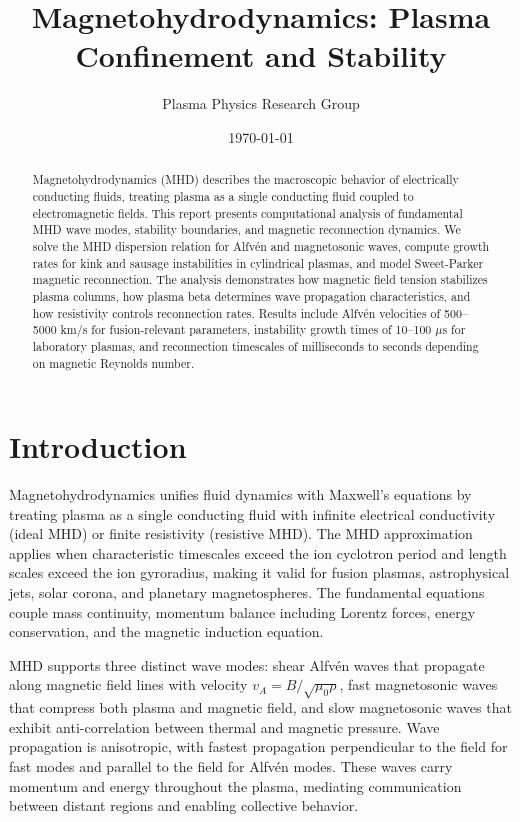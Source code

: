 \documentclass[11pt,a4paper]{article}
\title{Magnetohydrodynamics: Plasma Confinement and Stability}
\author{Plasma Physics Research Group}
\date{\today}
\begin{document}
\maketitle

\begin{abstract}
Magnetohydrodynamics (MHD) describes the macroscopic behavior of electrically conducting fluids, treating plasma as a single conducting fluid coupled to electromagnetic fields. This report presents computational analysis of fundamental MHD wave modes, stability boundaries, and magnetic reconnection dynamics. We solve the MHD dispersion relation for Alfvén and magnetosonic waves, compute growth rates for kink and sausage instabilities in cylindrical plasmas, and model Sweet-Parker magnetic reconnection. The analysis demonstrates how magnetic field tension stabilizes plasma columns, how plasma beta determines wave propagation characteristics, and how resistivity controls reconnection rates. Results include Alfvén velocities of 500–5000 km/s for fusion-relevant parameters, instability growth times of 10–100 $\mu$s for laboratory plasmas, and reconnection timescales of milliseconds to seconds depending on magnetic Reynolds number.
\end{abstract}

\section{Introduction}

Magnetohydrodynamics unifies fluid dynamics with Maxwell's equations by treating plasma as a single conducting fluid with infinite electrical conductivity (ideal MHD) or finite resistivity (resistive MHD). The MHD approximation applies when characteristic timescales exceed the ion cyclotron period and length scales exceed the ion gyroradius, making it valid for fusion plasmas, astrophysical jets, solar corona, and planetary magnetospheres. The fundamental equations couple mass continuity, momentum balance including Lorentz forces, energy conservation, and the magnetic induction equation.

MHD supports three distinct wave modes: shear Alfvén waves that propagate along magnetic field lines with velocity $v_A = B/\sqrt{\mu_0 \rho}$, fast magnetosonic waves that compress both plasma and magnetic field, and slow magnetosonic waves that exhibit anti-correlation between thermal and magnetic pressure. Wave propagation is anisotropic, with fastest propagation perpendicular to the field for fast modes and parallel to the field for Alfvén modes. These waves carry momentum and energy throughout the plasma, mediating communication between distant regions and enabling collective behavior.
\end{document}

